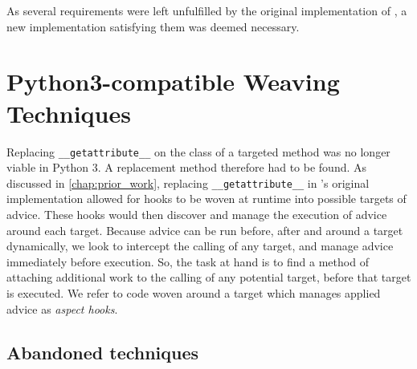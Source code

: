 As several requirements were left unfulfilled by the original
implementation of \pdsf{}, a new implementation satisfying them was deemed
necessary.


\section{Python3-compatible Weaving Techniques}\label{sec:pdsf3python3}

Replacing \lstinline{__getattribute__} on the class of a targeted method was no
longer viable in Python 3. A replacement method therefore had to be found. As
discussed in \cref{chap:prior_work}, replacing \lstinline{__getattribute__} in
\pdsf{}'s original implementation allowed for hooks to be woven
at runtime into possible targets of advice. These hooks would then
discover and manage the execution of advice around each target. Because advice
can be run before, after and around a target dynamically, we look to intercept the calling of
any target, and manage advice immediately before execution. So, the task at
hand is to find a method of attaching additional work to the calling of any
potential target, before that target is executed. We refer to code woven
around a target which manages applied advice as \emph{aspect hooks}.


\subsection{Abandoned techniques}\label{subsec:pdsf3badweaving}

